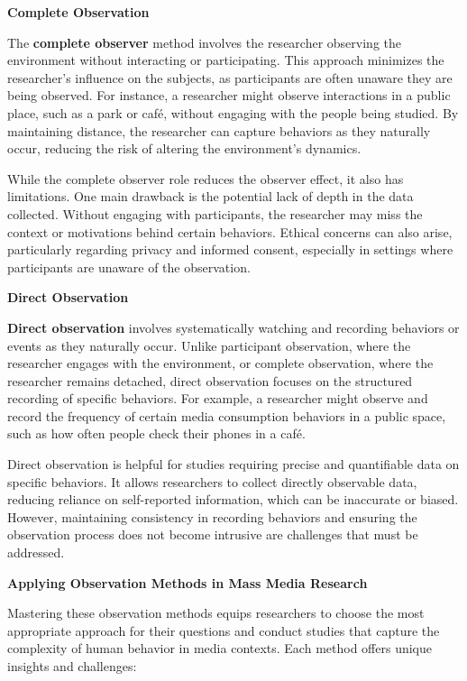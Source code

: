 \documentclass[
]{book}
\begin{document}
\textbf{Complete Observation}

The \textbf{complete observer} method involves the researcher observing the environment without interacting or participating. This approach minimizes the researcher's influence on the subjects, as participants are often unaware they are being observed. For instance, a researcher might observe interactions in a public place, such as a park or café, without engaging with the people being studied. By maintaining distance, the researcher can capture behaviors as they naturally occur, reducing the risk of altering the environment's dynamics.

While the complete observer role reduces the observer effect, it also has limitations. One main drawback is the potential lack of depth in the data collected. Without engaging with participants, the researcher may miss the context or motivations behind certain behaviors. Ethical concerns can also arise, particularly regarding privacy and informed consent, especially in settings where participants are unaware of the observation.

\textbf{Direct Observation}

\textbf{Direct observation} involves systematically watching and recording behaviors or events as they naturally occur. Unlike participant observation, where the researcher engages with the environment, or complete observation, where the researcher remains detached, direct observation focuses on the structured recording of specific behaviors. For example, a researcher might observe and record the frequency of certain media consumption behaviors in a public space, such as how often people check their phones in a café.

Direct observation is helpful for studies requiring precise and quantifiable data on specific behaviors. It allows researchers to collect directly observable data, reducing reliance on self-reported information, which can be inaccurate or biased. However, maintaining consistency in recording behaviors and ensuring the observation process does not become intrusive are challenges that must be addressed.

\textbf{Applying Observation Methods in Mass Media Research}

Mastering these observation methods equips researchers to choose the most appropriate approach for their questions and conduct studies that capture the complexity of human behavior in media contexts. Each method offers unique insights and challenges:
\end{document}
